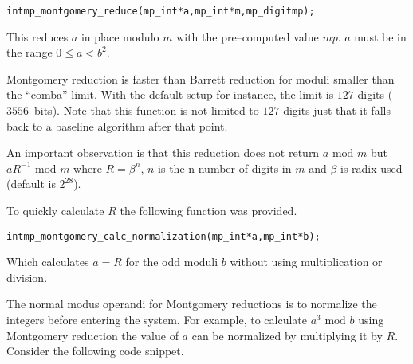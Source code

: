 \documentclass[synpaper]{book}
\begin{document}
\begin{alltt}
int mp_montgomery_reduce(mp_int *a, mp_int *m, mp_digit mp);
\end{alltt}
This reduces $a$ in place modulo $m$ with the pre--computed value $mp$.   $a$ must be in the range
$0 \le a < b^2$.

Montgomery reduction is faster than Barrett reduction for moduli smaller than the ``comba'' limit.  With the default
setup for instance, the limit is $127$ digits ($3556$--bits).   Note that this function is not limited to
$127$ digits just that it falls back to a baseline algorithm after that point.

An important observation is that this reduction does not return $a \mbox{ mod }m$ but $aR^{-1} \mbox{ mod }m$
where $R = \beta^n$, $n$ is the n number of digits in $m$ and $\beta$ is radix used (default is $2^{28}$).

To quickly calculate $R$ the following function was provided.

\begin{alltt}
int mp_montgomery_calc_normalization(mp_int *a, mp_int *b);
\end{alltt}
Which calculates $a = R$ for the odd moduli $b$ without using multiplication or division.

The normal modus operandi for Montgomery reductions is to normalize the integers before entering the system.  For
example, to calculate $a^3 \mbox { mod }b$ using Montgomery reduction the value of $a$ can be normalized by
multiplying it by $R$.  Consider the following code snippet.
\end{document}

